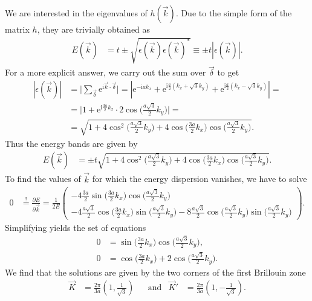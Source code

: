 \documentclass[english, parskip=full]{scrartcl}
\newcommand{\kla}{}
\newcommand{\tecxt}{}
\renewcommand{\i}{\text{i}}
\newcommand{\e}{\text{e}}
\begin{document}
We are interested in the eigenvalues of $h(\vec{k})$. 
Due to the simple form of the matrix $h$, they are trivially obtained as
\begin{align}
E(\vec{k})&=t\pm\sqrt{\epsilon(\vec{k})\epsilon(\vec{k})^\ast} \equiv \pm t\left\vert\epsilon(\vec{k})\right\vert.
\end{align}
For a more explicit answer, we carry out the sum over $\vec{\delta}$ to get
\begin{align}
\left\vert\epsilon(\vec{k})\right\vert&=\bigg\vert\sum_{\vec{\delta}}\e^{\i\vec{k}\cdot\vec{\delta}}\bigg\vert = \left\vert\e^{-\i ak_x} + \e^{\i \frac{a}{2} (k_x+\sqrt{3}k_y)} + \e^{\i \frac{a}{2} (k_x-\sqrt{3}k_y)}\right\vert=\\
&=\Big\vert 1+\e^{\i\frac{3a}{2}k_x}\cdot 2\cos\kla\Big( \frac{a\sqrt{3}}{2}k_y \Big) \Big\vert=\\
&=\sqrt{ 1+4\cos^2\kla\Big( \frac{a\sqrt{3}}{2}k_y \Big)+4\cos\kla\Big( \frac{3a}{2}k_x \Big)\cos\kla\Big( \frac{a\sqrt{3}}{2}k_y \Big) }.
\end{align}
Thus the energy bands are given by
\begin{align}
E(\vec{k})&=\pm t\sqrt{ 1+4\cos^2\kla\Big( \frac{a\sqrt{3}}{2}k_y \Big)+4\cos\kla\Big( \frac{3a}{2}k_x \Big)\cos\kla\Big( \frac{a\sqrt{3}}{2}k_y \Big) }.
\end{align}
To find the values of $\vec{k}$ for which the energy dispersion vanishes, we have to solve
\begin{align}
0&\overset{!}{=}\frac{\partial E}{\partial\vec{k}}=\frac{1}{2E}\begin{pmatrix}
-4\frac{3a}{2}\sin\kla\Big( \frac{3a}{2}k_x \Big)\cos\kla\Big( \frac{a\sqrt{3}}{2}k_y \Big) \\ 
-4\frac{a\sqrt{3}}{2}\cos\kla\Big( \frac{3a}{2}k_x \Big)\sin\kla\Big( \frac{a\sqrt{3}}{2}k_y \Big)-8\frac{a\sqrt{3}}{2}\cos\Big(\frac{a\sqrt{3}}{2}k_y\Big)\sin\Big(\frac{a\sqrt{3}}{2}k_y\Big)
\end{pmatrix}.
\end{align}
Simplifying yields the set of equations
\begin{align}
0&=\sin\kla\Big( \frac{3a}{2}k_x \Big)\cos\kla\Big( \frac{a\sqrt{3}}{2}k_y \Big),\\
0&=\cos\kla\Big( \frac{3a}{2}k_x \Big)+2\cos\kla\Big( \frac{a\sqrt{3}}{2}k_y \Big).
\end{align}
We find that the solutions are given by the two corners of the first Brillouin zone
\begin{align}
\vec{K}&=\frac{2\pi}{3a}\kla\left( 1,\frac{1}{\sqrt{3}} \right)&&\tecxt\text{and}&\vec{K}'&=\frac{2\pi}{3a}\kla\left( 1,-\frac{1}{\sqrt{3}} \right).
\end{align}
\end{document}
